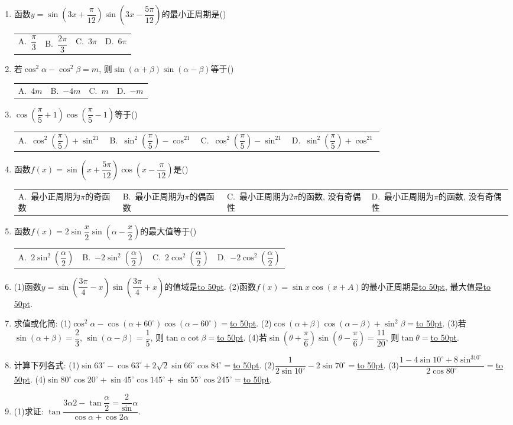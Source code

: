\documentclass[10pt,a4paper]{article}
\newcommand{\blank}[1]{\underline{\hbox to #1pt{}}}
\newcommand{\fourch}[4]{\par\begin{tabular}{p{.23\textwidth}p{.23\textwidth}p{.23\textwidth}p{.23\textwidth}}
A.~#1 &B.~#2& C.~#3& D.~#4
\end{tabular}}
\begin{document}
\begin{enumerate}[1.]
解  ∵$\sin ^2\alpha +\sin ^2\beta =\dfrac{1-\cos 2\alpha }2+\dfrac{1-\cos 2\beta }2=1-\dfrac 12(\cos 2\alpha +\cos 2\beta)$
\blank{50}$=1-\cos (\alpha +\beta)\cos (\alpha -\beta)=1+\dfrac 12\cos (\alpha -\beta)$,
又$=-1\le \cos (\alpha -\beta)\le 1$, ∴$\sin ^2\alpha +\sin ^2\beta$的取值范围是$[\dfrac 12,\dfrac 32]$.
【训练题】
(一)积化和差公式
\item 函数$y=\sin (3x+\dfrac{\pi }{12})\sin (3x-\dfrac{5\pi }{12})$的最小正周期是()
\fourch{$\dfrac{\pi }3$}{$\dfrac{2\pi }3$}{$3\pi$}{$6\pi$}
\item 若$\cos ^2\alpha -\cos ^2\beta =m$, 则$\sin (\alpha +\beta)\sin (\alpha -\beta)$等于()
\fourch{$4m$}{$-4m$}{$m$}{$-m$}
\item $\cos (\dfrac{\pi }5+1)\cos (\dfrac{\pi }5-1)$等于()
\fourch{$\cos ^2(\dfrac{\pi }5)+\sin ^21$}{$\sin ^2(\dfrac{\pi }5)-\cos ^21$}{$\cos ^2(\dfrac{\pi }5)-\sin ^21$}{$\sin ^2(\dfrac{\pi }5)+\cos ^21$}
\item 函数$f(x)=\sin (x+\dfrac{5\pi }{12})\cos (x-\dfrac{\pi }{12})$是()
\fourch{最小正周期为$\pi$的奇函数}{最小正周期为$\pi$的偶函数}{最小正周期为$2\pi$的函数, 没有奇偶性}{最小正周期为$\pi$的函数, 没有奇偶性}
\item 函数$f(x)=2\sin \dfrac x2\sin (\alpha -\dfrac x2)$的最大值等于()
\fourch{$2\sin ^2(\dfrac{\alpha }2)$}{$-2\sin ^2(\dfrac{\alpha }2)$}{$2\cos ^2(\dfrac{\alpha }2)$}{$-2\cos ^2(\dfrac{\alpha }2)$}
\item (1)函数$y=\sin (\dfrac{3\pi }4-x)\sin (\dfrac{3\pi }4+x)$的值域是\blank{50}.
(2)函数$f(x)=\sin x\cos (x+A)$的最小正周期是\blank{50}, 最大值是\blank{50}.
\item 求值或化简:
(1)$\cos ^2\alpha -\cos (\alpha +60^{\circ })\cos (\alpha -60^{\circ })=$\blank{50}.
(2)$\cos (\alpha +\beta)\cos (\alpha -\beta)+\sin ^2\beta =$\blank{50}.
(3)若$\sin (\alpha +\beta)=\dfrac 23$, $\sin (\alpha -\beta)=\dfrac 15$, 则$\tan \alpha \cot \beta =$\blank{50}.
(4)若$\sin (\theta +\dfrac\pi 6)\sin (\theta -\dfrac{\pi }6)=\dfrac {11}{20}$, 则$\tan \theta =$\blank{50}.
\item 计算下列各式:
(1)$\sin 63^\circ -\cos 63^\circ +2\sqrt 2\sin 66^\circ \cos 84^\circ =$\blank{50}.
(2)$\dfrac 1{2\sin 10^\circ }-2\sin 70^\circ =$\blank{50}.
(3)$\dfrac{1-4\sin 10^\circ +8\sin ^310^\circ }{2\cos 80^\circ }=$\blank{50}.
(4)$\sin 80^\circ \cos 20^\circ +\sin 45^\circ \cos 145^\circ +\sin 55^\circ \cos 245^\circ =$\blank{50}.
\item (1)求证: $\tan \dfrac{3\alpha 2-\tan \dfrac{\alpha }2=\dfrac 2\sin \alpha }{\cos \alpha +\cos 2\alpha }$.

\end{enumerate}
\end{document}
